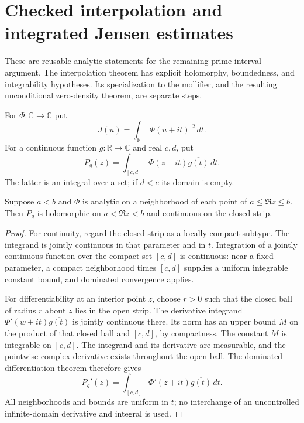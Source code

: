 \section{Checked interpolation and integrated Jensen estimates}

These are reusable analytic statements for the remaining prime-interval
argument.  The interpolation theorem has explicit holomorphy, boundedness,
and integrability hypotheses.  Its specialization to the mollifier, and
the resulting unconditional zero-density theorem, are separate steps.

\begin{definition}
\label{density:vertical-l2}
\leanok
For $\Phi:\mathbb C\to\mathbb C$ put
\[
 J(u)=\int_{\mathbb R}|\Phi(u+it)|^2\,dt.
\]
For a continuous function $g:\mathbb R\to\mathbb C$ and real $c,d$, put
\[
 P_g(z)=\int_{[c,d]}\Phi(z+it)\overline{g(t)}\,dt.
\]
The latter is an integral over a set; if $d<c$ its domain is empty.
\end{definition}

\begin{lemma}
\label{density:compact-parameter}
\leanok
Suppose $a<b$ and $\Phi$ is analytic on a neighborhood of each point
of $a\leq\Re z\leq b$.  Then $P_g$ is holomorphic on
$a<\Re z<b$ and continuous on the closed strip.
\end{lemma}
\begin{proof}
For continuity, regard the closed strip as a locally compact subtype.
The integrand is jointly continuous in that parameter and in $t$.
Integration of a jointly continuous function over the compact set
$[c,d]$ is continuous: near a fixed parameter, a compact neighborhood
times $[c,d]$ supplies a uniform integrable constant bound, and
dominated convergence applies.

For differentiability at an interior point $z$, choose $r>0$ such that
the closed ball of radius $r$ about $z$ lies in the open strip.
The derivative integrand
$\Phi'(w+it)\overline{g(t)}$ is jointly continuous there.
Its norm has an upper bound $M$ on the product of that closed ball
and $[c,d]$, by compactness.  The constant $M$ is integrable on
$[c,d]$.  The integrand and its derivative are measurable, and the
pointwise complex derivative exists throughout the open ball.
The dominated differentiation theorem therefore gives
\[
 P_g'(z)=\int_{[c,d]}\Phi'(z+it)\overline{g(t)}\,dt.
\]
All neighborhoods and bounds are uniform in $t$; no interchange of an
uncontrolled infinite-domain derivative and integral is used.
\end{proof}



